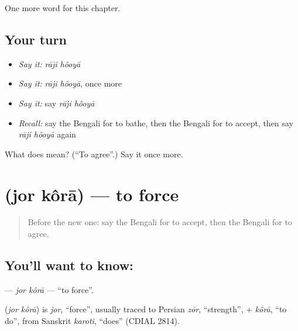 \begin{grammarlens}[title={What you've built}]
One more word for this chapter.
\end{grammarlens}

\subsection*{Your turn}
\begin{itemize}
\raggedright
  \item \emph{Say it:} \emph{rāji hôoyā}
  \item \emph{Say it:} \emph{rāji hôoyā}, once more
  \item \emph{Say it:} say \emph{rāji hôoyā}
  \item \emph{Recall:} say the Bengali for to bathe, then the Bengali for to accept, then say \emph{rāji hôoyā} again
\end{itemize}

\begin{tcolorbox}[breakable,colback=teal!4,colframe=teal!35!black,title={Before you move on}]
What does   mean? (\textquotedblleft{}To agree\textquotedblright{}.) Say it once more.
\end{tcolorbox}
\section[\texorpdfstring{\bn{জোর} \bn{করা} (jor kôrā)}{জোর করা (jor kôrā)}]{  (jor kôrā) — to force}

\label{lesson:BN-C184-jor-kora}



\begin{quote}
Before the new one: say the Bengali for to accept, then the Bengali for to agree.
\end{quote}

\subsection*{You'll want to know:  }
\textbf{ } — \emph{jor kôrā} — \textquotedblleft{}to force\textquotedblright{}.

\begin{cousinweb}
\textbf{ } (\emph{jor kôrā}) is \emph{jor}, \textquotedblleft{}force\textquotedblright{}, usually traced to Persian \emph{zōr}, \textquotedblleft{}strength\textquotedblright{}, + \emph{kôrā}, \textquotedblleft{}to do\textquotedblright{}, from Sanskrit \emph{karoti}, \textquotedblleft{}does\textquotedblright{} (CDIAL 2814).
\end{cousinweb}

